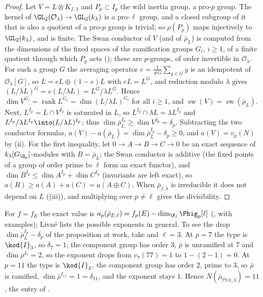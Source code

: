 \begin{proof}
Let $V=L\otimes K_{f,\lambda}$ and $P_p\subset I_p$ the wild inertia group, a pro-$p$ group. The kernel of $\GL_2(\mathcal{O}_\lambda)\to\GL_2(k_\lambda)$ is a pro-$\ell$ group, and a closed
subgroup of it that is also a quotient of a pro-$p$ group is trivial; so $\rho(P_p)$ maps injectively to $\GL_2(k_\lambda)$, and is finite. The Swan conductor of
$V$ (and of $\bar\rho_L$) is computed from the dimensions of the fixed spaces of the ramification groups $G_i$, $i\ge1$, of a finite quotient through which $P_p$
acts (); these are $p$-groups, of order invertible in $\mathcal{O}_\lambda$. For such a group $G$ the averaging operator $e=\frac1{\#G}\sum_{g\in G}g$ is an
idempotent of $\mathcal{O}_\lambda[G]$, so $L=eL\oplus(1-e)L$ with $eL=L^G$, and reduction modulo $\lambda$ gives $(L/\lambda L)^G=e(L/\lambda L)=L^G/\lambda L^G$. Hence
$\dim V^{G_i}=\operatorname{rank}L^{G_i}=\dim(L/\lambda L)^{G_i}$ for all $i\ge1$, and $\operatorname{sw}(V)=\operatorname{sw}(\bar\rho_L)$. Next, $L^{I_p}=L\cap V^{I_p}$ is saturated in $L$, so
$L^{I_p}\cap\lambda L=\lambda L^{I_p}$ and $L^{I_p}/\lambda L^{I_p}\into(L/\lambda L)^{I_p}$; thus $\dim\bar\rho_L^{I_p}\ge\dim V^{I_p}=\delta_p$. Subtracting the two conductor formulas,
$a(V)-a(\bar\rho_L)=\dim\bar\rho_L^{I_p}-\delta_p\ge0$, and $a(V)=v_p(N)$ by (ii). For the first inequality, let $0\to A\to B\to C\to0$ be an exact
sequence of $k_\lambda[G_{\Q_p}]$-modules with $B=\bar\rho_L$; the Swan conductor is additive (the fixed points of a group of order prime to $\ell$ form an
exact functor), and $\dim B^{I_p}\le\dim A^{I_p}+\dim C^{I_p}$ (invariants are left exact), so $a(B)\ge a(A)+a(C)=a(A\oplus C)$. When $\bar\rho_{f,\lambda}$ is irreducible it
does not depend on $L$ ((iii)), and multiplying over $p\ne\ell$ gives the divisibility.
\end{proof}

For $f=f_E$ the exact value is $a_p(\bar\rho_{E,\ell})=f_p(E)-\dim_{\F_\ell}\Phig_p[\ell]$ (, with examples); Livn\'e \cite{Livne89} lists the possible
exponents in general. To see the drop $\dim\bar\rho_L^{I_p}-\delta_p$ of the proposition at work, take  and $\ell=3$. At $p=7$ the type is $\kod{I}_3$, so $\delta_7=1$; the
component group has order $3$, $\bar\rho$ is unramified at $7$ and $\dim\bar\rho^{I_7}=2$, so the exponent drops from $v_7(77)=1$ to $1-(2-1)=0$. At $p=11$ the type is $\kod{I}_2$, the
component group has order $2$, prime to $3$, so $\bar\rho$ is ramified, $\dim\bar\rho^{I_{11}}=1=\delta_{11}$, and the exponent stays $1$. Hence $N(\bar\rho_{77c1,3})=11$, the entry
of .

